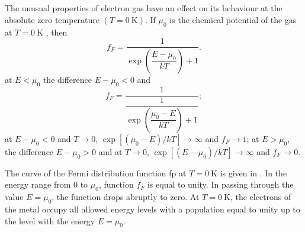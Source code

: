 \subsection{}\label{41.4.2} The unusual properties of electron gas have an effect on its behaviour at the absolute zero temperature $(T = \SI{0}{\kelvin})$. If $\mu_{0}$ is the chemical potential of the gas at $T = \SI{0}{\kelvin}$ , then
\begin{equation*}%
f_{F} = \frac{1}{\exp \left(\dfrac{E - \mu_{0}}{kT} \right) +1}.
\end{equation*}
at $E < \mu_{0}$ the difference $E - \mu_{0} < 0$ and
\begin{equation*}%
f_{F} = \frac{1}{\dfrac{1}{\exp \left(\dfrac{ \mu_{0} - E}{kT} \right) +1}};
\end{equation*}
at $E - \mu_{0} < 0$ and $T \to 0$, $\exp [(\mu_{0} - E)/kT] \to \infty$ and $f_{F} \to 1$; at $E > \mu_{0}$, the difference $ E - \mu_{0} > 0$ and at $T \to 0$, $\exp [(E - \mu_{0})/kT] \to  \infty$ and $f_{F} \to 0$.




The curve of the Fermi distribution function fp at $T = \SI{0}{\kelvin}$ is given in . In the energy range from 0 to $\mu_{0}$, function $f_{F}$ is equal to unity. In passing through the value $E = \mu_{0}$, the function drops abruptly to zero. At $T = \SI{0}{\kelvin}$, the electrons of the metal occupy all allowed energy levels with a population equal to unity  up to the level with the energy $E = \mu_{0}$.


